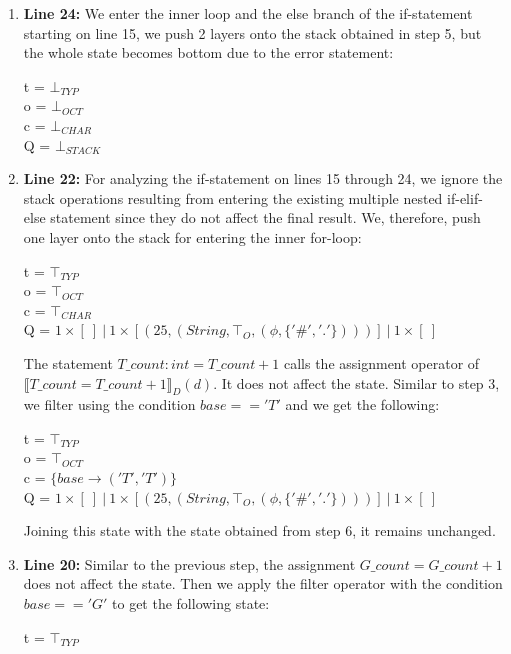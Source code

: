 \documentclass[10pt]{report}
\begin{document}
\begin{enumerate}
	\item \textbf{Line 24:} We enter the inner loop and the else branch of the if-statement starting on line 15, we push 2 layers onto the stack obtained in step 5, but the whole state becomes bottom due to the error statement: 
	\begin{center}
		t = $ \bot_{TYP} $ \\
		o = $ \bot_{OCT}$ \\
		c = $ \bot_{CHAR} $ \\
		Q = $ \bot_{STACK} $
	\end{center}
	\item \textbf{Line 22:} For analyzing the if-statement on lines 15 through 24, we ignore the stack operations resulting from entering the existing multiple nested if-elif-else statement since they do not affect the final result. We, therefore, push one layer onto the stack for entering the inner for-loop:
	\begin{center}
		t = $ \top_{TYP} $ \\
		o = $ \top_{OCT}$ \\
		c =  $ \top_{CHAR} $\\
		Q = $ 1 \times [\ ]\ \vert\ 1 \times [(25, (String, \top_{O}, (\phi, \lbrace '\#', '.' \rbrace)))]\ \vert\ 1 \times [\ ]$\\
	\end{center}
	The statement $ T\_count: int = T\_count + 1 $ calls the assignment operator of $ \llbracket T\_count = T\_count + 1 \rrbracket_{D}(d)$. It does not affect the state. 
	Similar to step 3, we filter using the condition $ base == 'T' $ and we get the following:
	\begin{center}
		t = $ \top_{TYP} $ \\
		o = $ \top_{OCT}$ \\
		c =  $ \lbrace base \rightarrow ('T', 'T') \rbrace $\\
		Q = $ 1 \times [\ ]\ \vert\ 1 \times [(25, (String, \top_{O}, (\phi, \lbrace '\#', '.' \rbrace)))]\ \vert\ 1 \times [\ ]$\\
	\end{center}
	Joining this state with the state obtained from step 6, it remains unchanged. 
	\item \textbf{Line 20:} Similar to the previous step, the assignment $ G\_count = G\_count + 1 $ does not affect the state. Then we apply the filter operator with the condition $ base == 'G' $ to get the following state: 
	\begin{center}
		t = $ \top_{TYP} $ \\

\end{center}
\end{enumerate}
\end{document}

